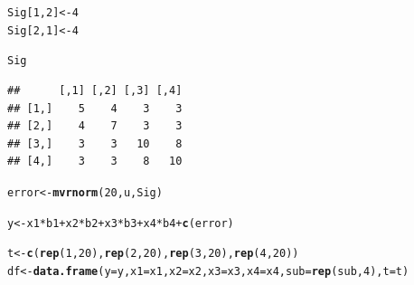 \documentclass[11pt,a4paper,twoside]{book}\usepackage[]{graphicx}\usepackage[]{color}
\makeatletter
\newcommand{\hlnum}[1]{\textcolor[rgb]{0.686,0.059,0.569}{#1}}%
\newcommand{\hlopt}[1]{\textcolor[rgb]{0,0,0}{#1}}%
\newcommand{\hlstd}[1]{\textcolor[rgb]{0.345,0.345,0.345}{#1}}%
\newcommand{\hlkwb}[1]{\textcolor[rgb]{0.69,0.353,0.396}{#1}}%
\newcommand{\hlkwc}[1]{\textcolor[rgb]{0.333,0.667,0.333}{#1}}%
\newcommand{\hlkwd}[1]{\textcolor[rgb]{0.737,0.353,0.396}{\textbf{#1}}}%
\newenvironment{kframe}{%
 \def\at@end@of@kframe{}%
 \ifinner\ifhmode%
  \def\at@end@of@kframe{\end{minipage}}%
  \begin{minipage}{\columnwidth}%
 \fi\fi%
 \def\FrameCommand##1{\hskip\@totalleftmargin \hskip-\fboxsep
 \colorbox{shadecolor}{##1}\hskip-\fboxsep
     \hskip-\linewidth \hskip-\@totalleftmargin \hskip\columnwidth}%
 \MakeFramed {\advance\hsize-\width
   \@totalleftmargin\z@ \linewidth\hsize
   \@setminipage}}%
 {\par\unskip\endMakeFramed%
 \at@end@of@kframe}
\newenvironment{knitrout}{}{} %
\makeatother
\begin{document}
\begin{knitrout}
\begin{kframe}
\begin{alltt}
\hlstd{Sig[}\hlnum{1}\hlstd{,}\hlnum{2}\hlstd{]} \hlkwb{<-} \hlnum{4}
\hlstd{Sig[}\hlnum{2}\hlstd{,}\hlnum{1}\hlstd{]} \hlkwb{<-}\hlnum{4}

\hlstd{Sig}
\end{alltt}
\begin{verbatim}
##      [,1] [,2] [,3] [,4]
## [1,]    5    4    3    3
## [2,]    4    7    3    3
## [3,]    3    3   10    8
## [4,]    3    3    8   10
\end{verbatim}
\begin{alltt}
\hlstd{error} \hlkwb{<-} \hlkwd{mvrnorm}\hlstd{(}\hlnum{20}\hlstd{, u, Sig)}

\hlstd{y}\hlkwb{<-} \hlstd{x1}\hlopt{*}\hlstd{b1} \hlopt{+}\hlstd{x2}\hlopt{*}\hlstd{b2} \hlopt{+} \hlstd{x3}\hlopt{*}\hlstd{b3} \hlopt{+}\hlstd{x4}\hlopt{*}\hlstd{b4} \hlopt{+}\hlkwd{c}\hlstd{(error)}


\hlstd{t} \hlkwb{<-} \hlkwd{c}\hlstd{(}\hlkwd{rep}\hlstd{(}\hlnum{1}\hlstd{,} \hlnum{20}\hlstd{),} \hlkwd{rep}\hlstd{(}\hlnum{2}\hlstd{,} \hlnum{20}\hlstd{),} \hlkwd{rep}\hlstd{(}\hlnum{3}\hlstd{,} \hlnum{20}\hlstd{),} \hlkwd{rep}\hlstd{(}\hlnum{4}\hlstd{,} \hlnum{20}\hlstd{))}
\hlstd{df} \hlkwb{<-} \hlkwd{data.frame}\hlstd{(}\hlkwc{y}\hlstd{=y,} \hlkwc{x1} \hlstd{= x1,} \hlkwc{x2}\hlstd{=x2 ,} \hlkwc{x3} \hlstd{= x3,} \hlkwc{x4} \hlstd{= x4,} \hlkwc{sub} \hlstd{=} \hlkwd{rep}\hlstd{(sub,}\hlnum{4}\hlstd{),} \hlkwc{t} \hlstd{=t)}




\end{alltt}
\end{kframe}
\end{knitrout}
\end{document}
